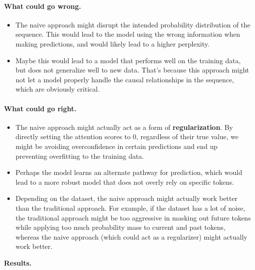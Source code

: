 \documentclass{article}
\begin{document}
\paragraph{What could go wrong.}

\begin{itemize}
    \item The naive approach might disrupt the intended probability distribution
    of the sequence. This would lead to the model using the wrong information
    when making predictions, and would likely lead to a higher perplexity.
    \item Maybe this would lead to a model that performs well on the training
    data, but does not generalize well to new data. That's because this approach
    might not let a model properly handle the causal relationships in the
    sequence, which are obviously critical.
\end{itemize}

\paragraph{What could go right.}

\begin{itemize}
    \item The naive approach might actually act as a form of
    \textbf{regularization}. By directly setting the attention scores to 0,
    regardless of their true value, we might be avoiding overconfidence in
    certain predictions and end up preventing overfitting to the training data.
    \item Perhaps the model learns an alternate pathway for prediction, which
    would lead to a more robust model that does not overly rely on specific
    tokens.
    \item Depending on the dataset, the naive approach might actually work
    better than the traditional approach. For example, if the dataset has a lot
    of noise, the traditional approach might be too aggressive in masking out
    future tokens while applying too much probability mass to current and past
    tokens, whereas the naive approach (which could act as a regularizer) might
    actually work better.
\end{itemize}
\vspace{0.5cm}
\textbf{Results.}
\end{document}
